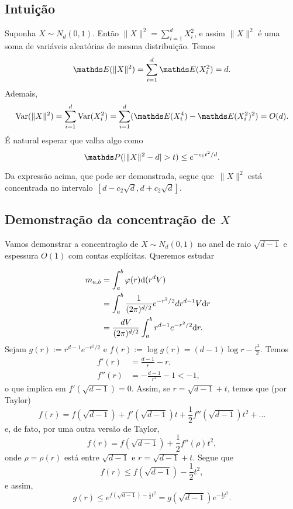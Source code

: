\subsection{Intuição}
Suponha $X\sim N_d(0,1)$. Então $\|X\|^2 = \sum_{i = 1}^{d}X_i^2$, e assim
$\|X\|^2$ é uma soma de variáveis aleatórias de mesma distribuição. Temos
\begin{equation*}\label{key}
\EE(\|X\|^2) = \sum_{i = 1}^d\EE(X_i^2) = d.
\end{equation*}
Ademais,
\begin{equation*}\label{key}
\Var(\|X\|^2) = \sum_{i = 1}^d\Var(X_i^2) 
= \sum_{i = 1}^d(\EE(X_i^4) - \EE(X_i^2)^2) = O(d).
\end{equation*}
É natural esperar que valha algo como
\begin{equation*}\label{key}
\PP(|\|X\|^2 - d| > t) \leq e^{-c_1 t^2/d}.
\end{equation*}

Da expressão acima, que pode ser demonstrada, segue que~$\|X\|^2$ 
está concentrada no intervalo~${[d - c_2\sqrt{d}, d + c_2\sqrt{d}]}$.

\subsection{Demonstração da concentração de $X$}

Vamos demonstrar a concentração de ${X\sim N_d(0,1)}$ no anel de raio
$\sqrt{d-1}$ e espessura $O(1)$ com contas explícitas. Queremos estudar

\begin{align*}
m_{a,b} & = \int_a^b\varphi(r)\mathrm d(r^dV)& \\
		& = \int_a^b\frac{1}{(2\pi)^{d/2}}e^{-r^2/2}dr^{d-1}V\mathrm d r&\\
		& = \frac{dV}{(2\pi)^{d/2}}\int_a^b r^{d-1}e^{-r^2/2}\mathrm d r.&
\end{align*}
Sejam $g(r) := r^{d-1}e^{-r^2/2}$ e $f(r) := \log g(r) 
= (d-1) \log r - \frac{r^2}{2}$. Temos
\begin{align*}
f'(r)& = \frac{d-1}{r} - r,&\\
f''(r)& = -\frac{d-1}{r^2} - 1 < -1,&
\end{align*}
o que implica em $f'(\sqrt{d-1}) = 0$.
Assim, se $ r = \sqrt{d-1} + t$, temos que (por Taylor)
\begin{equation*}
f(r) = f(\sqrt{d-1}) + f'(\sqrt{d-1})t + \frac{1}{2}f''(\sqrt{d-1})t^2 +\dots
\end{equation*}
e, de fato, por uma outra versão de Taylor,
\begin{equation*}
f(r) = f(\sqrt{d-1}) + \frac{1}{2}f''(\rho)t^2,
\end{equation*}
onde $\rho = \rho(r)$ está entre $\sqrt{d-1}$ e $r = \sqrt{d-1} + t$.
Segue que 
\begin{equation*}
f(r) \leq f(\sqrt{d-1}) - \frac{1}{2}t^2,
\end{equation*}
e assim,
\begin{equation*}
g(r) \leq e^{f(\sqrt{d-1}) - \frac{1}{2}t^2} 
= g(\sqrt{d-1})e^{-\frac{1}{2}t^2}.
\end{equation*}

